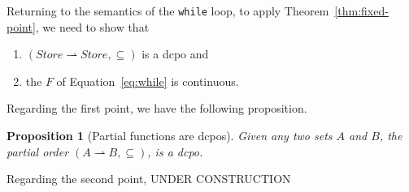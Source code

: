 \documentclass{tufte-handout}
\newtheorem{proposition}[theorem]{Proposition}
\begin{document}
Returning to the semantics of the \texttt{while} loop, to apply
Theorem~\ref{thm:fixed-point}, we need to show that
\begin{enumerate}
\item $(\mathit{Store}{\rightharpoonup}\mathit{Store},\subseteq)$ is a dcpo and
\item the $F$ of Equation~\ref{eq:while} is continuous.
\end{enumerate}
Regarding the first point, we have the following proposition.

\begin{proposition}[Partial functions are dcpos]
  Given any two sets $A$ and $B$, the partial order $(A \rightharpoonup
  B, \subseteq)$, is a dcpo.
\end{proposition}

Regarding the second point, UNDER CONSTRUCTION


\end{document}
